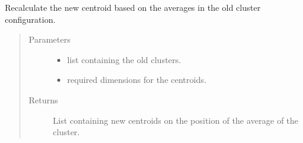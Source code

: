 \documentclass[letterpaper,10pt,english]{sphinxmanual}
\begin{document}
\begin{fulllineitems}
\label{\detokenize{clustering:clustering.calculateCentroids}}
\sphinxAtStartPar
Recalculate the new centroid based on the averages in the old cluster configuration.
\begin{quote}\begin{description}
\item[{Parameters}] \leavevmode\begin{itemize}
\item {} 
\sphinxAtStartPar
{} \textendash{} list containing the old clusters.

\item {} 
\sphinxAtStartPar
{} \textendash{} required dimensions for the centroids.

\end{itemize}

\item[{Returns}] \leavevmode
\sphinxAtStartPar
List containing new centroids on the position of the average of the cluster.

\end{description}\end{quote}

\end{fulllineitems}

\end{document}
